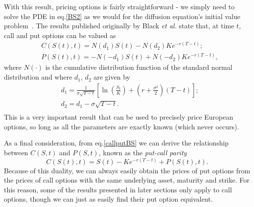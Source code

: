 With this result, pricing options is fairly straightforward - we simply need to solve the PDE in eq.\eqref{BS2} as we would for the diffusion equation's initial value problem~\cite{Dilao}.
The results published originally by Black \textit{et al.} state that, at time $t$, call and put options can be valued as
\begin{equation}\label{callputBS}
\begin{split}
&C(S(t),t)=N(d_1)S(t)-N(d_2)Ke^{-r(T-t)};\\
&P(S(t),t)=-N(-d_1)S(t)+N(-d_2)Ke^{-r(T-t)},
\end{split}
\end{equation}
\noindent where $N(\cdot)$ is the cumulative distribution function of the standard normal distribution and where $d_1$, $d_2$ are given by
\begin{equation}\label{d1d2}
\begin{split}
&d_1=\frac{1}{\sigma\sqrt{T-t}}\left[\ln\left(\frac{S_t}{K}\right)+\left(r+\frac{\sigma^2}{2}\right)(T - t)\right];\\
&d_2=d_1-\sigma\sqrt{T-t}.\\
\end{split}
\end{equation}
\noindent This is a very important result that can be used to precisely price European options, so long as all the parameters are exactly known (which never occurs).


As a final consideration, from eq.\eqref{callputBS} we can derive the relationship between $C(S,t)$ and $P(S,t)$, known as the \emph{put-call parity}
\begin{equation}
C(S(t),t)=S(t)-Ke^{-r(T-t)}+P(S(t),t).
\end{equation}
\noindent Because of this duality, we can always easily obtain the prices of put options from the prices of call options with the same underlying asset, maturity and strike. For this reason, some of the results presented in later sections only apply to call options, though we can just as easily find their put option equivalent.
